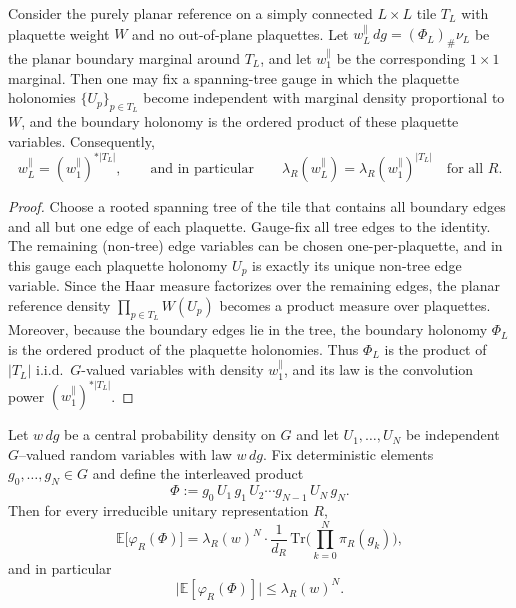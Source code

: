 \begin{lemma}\label{lem:planar_exact_convolution}
Consider the purely planar reference on a simply connected $L\times L$ tile $T_L$ with plaquette weight $W$ and no out-of-plane plaquettes.
Let $w_L^{\parallel}\,dg=(\Phi_L)_{\#}\nu_L$ be the planar boundary marginal around $T_L$, and let $w_1^{\parallel}$ be the corresponding $1\times 1$ marginal.
Then one may fix a spanning-tree gauge in which the plaquette holonomies $\{U_p\}_{p\in T_L}$ become independent with marginal density proportional to $W$,
and the boundary holonomy is the ordered product of these plaquette variables.
Consequently,
\[
w_L^{\parallel}=(w_1^{\parallel})^{*|T_L|},
\qquad\text{and in particular}\qquad
\lambda_R(w_L^{\parallel})=\lambda_R(w_1^{\parallel})^{|T_L|}\quad\text{for all }R.
\]
\end{lemma}
\begin{proof}
Choose a rooted spanning tree of the tile that contains all boundary edges and all but one edge of each plaquette.
Gauge-fix all tree edges to the identity. The remaining (non-tree) edge variables can be chosen one-per-plaquette, and in this gauge each plaquette holonomy $U_p$
is exactly its unique non-tree edge variable.
Since the Haar measure factorizes over the remaining edges, the planar reference density $\prod_{p\in T_L}W(U_p)$ becomes a product measure over plaquettes.
Moreover, because the boundary edges lie in the tree, the boundary holonomy $\Phi_L$ is the ordered product of the plaquette holonomies.
Thus $\Phi_L$ is the product of $|T_L|$ i.i.d.\ $G$-valued variables with density $w_1^{\parallel}$, and its law is the convolution power $(w_1^{\parallel})^{*|T_L|}$.
\end{proof}


\begin{lemma}\label{lem:schur_insertion_bound}
Let $w\,dg$ be a central probability density on $G$ and let $U_1,\dots,U_N$ be independent $G$--valued random variables with law $w\,dg$.
Fix deterministic elements $g_0,\dots,g_N\in G$ and define the interleaved product
\[
\Phi:= g_0\,U_1\,g_1\,U_2\cdots g_{N-1}\,U_N\,g_N.
\]
Then for every irreducible unitary representation $R$,
\begin{equation}\label{eq:schur_insertion_expect}
\mathbb E\!\big[\varphi_R(\Phi)\big]
=
\lambda_R(w)^N\cdot \frac{1}{d_R}\,\mathrm{Tr}\!\Big(\prod_{k=0}^N \pi_R(g_k)\Big),
\end{equation}
and in particular
\begin{equation}\label{eq:schur_insertion_bound}
\big|\mathbb E[\varphi_R(\Phi)]\big|\le \lambda_R(w)^N.
\end{equation}
\end{lemma}

